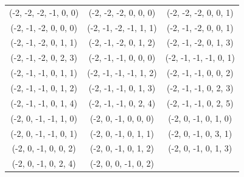 

\begin{center}
\begin{tabular}{ccc}
(-2,  -2,  -2,    -1,     0,     0)&  
(-2,  -2,  -2,     0,     0,     0)&
(-2,  -2,  -2,     0,     0,     1)\\
(-2,  -1,  -2,     0,     0,     0)&
(-2,  -1,  -2,    -1,     1,     1)&
(-2,  -1,  -2,     0,     0,     1)\\
(-2,  -1,  -2,     0,     1,     1)&
(-2,  -1,  -2,     0,     1,     2)&
(-2,  -1,  -2,     0,     1,     3)\\
(-2,  -1,  -2,     0,     2,     3)&
(-2,  -1,  -1,     0,     0,     0)&
(-2,  -1,  -1,    -1,     0,     1)\\
(-2,  -1,  -1,     0,     1,     1)&
(-2,  -1,  -1,    -1,     1,     2)&
(-2,  -1,  -1,     0,     0,     2)\\
(-2,  -1,  -1,     0,     1,     2)&
(-2,  -1,  -1,     0,     1,     3)&
(-2,  -1,  -1,     0,     2,     3)\\
(-2,  -1,  -1,     0,     1,     4)&
(-2,  -1,  -1,     0,     2,     4)&
(-2,  -1,  -1,     0,     2,     5)\\
(-2,  0, -1,   -1,    1,    0)& 
(-2,  0, -1,    0,    0,    0)&
(-2,  0, -1,    0,    1,    0)\\
(-2,  0, -1,   -1,    0,    1)&
(-2,  0, -1,    0,    1,    1)&
(-2,  0, -1,    0,    3,    1)\\
(-2,  0, -1,    0,    0,    2)&
(-2,  0, -1,    0,    1,    2)&
(-2,  0, -1,    0,    1,    3)\\
(-2,  0, -1,    0,    2,    4) &
(-2,  0,  0,    -1,   0,     2) &
\end{tabular}
\label{tab: mob P}
\end{center}

